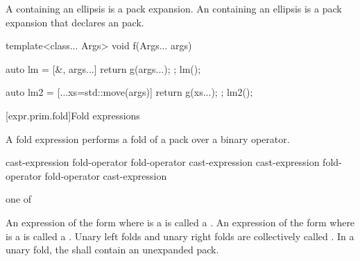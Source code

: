 \pnum
A  containing an ellipsis is a pack
expansion.
%
An  containing an ellipsis is a pack
expansion that declares an
 pack.
\begin{example}
\begin{codeblock}
template<class... Args>
void f(Args... args) {
  auto lm = [&, args...] { return g(args...); };
  lm();

  auto lm2 = [...xs=std::move(args)] { return g(xs...); };
  lm2();
}
\end{codeblock}
\end{example}

[expr.prim.fold]{Fold expressions}%

\pnum
A fold expression performs a fold of a
pack over a binary operator.

\begin{bnf}
\br
    \terminal{(} cast-expression fold-operator  \terminal{)}\br
    \terminal{(}  fold-operator cast-expression \terminal{)}\br
    \terminal{(} cast-expression fold-operator  fold-operator cast-expression \terminal{)}
\end{bnf}

\begin{bnf}
 \textnormal{one of}\br
    \terminal{+ }\quad\terminal{- }\quad\terminal{* }\quad\terminal{/ }\quad\terminal{\% }\quad\terminal{\caret{} }\quad\terminal{\& }\quad\terminal{| }\quad\terminal{<< }\quad\terminal{>> }\br
    \terminal{+=}\quad\terminal{-=}\quad\terminal{*=}\quad\terminal{/=}\quad\terminal{\%=}\quad\terminal{\caret=}\quad\terminal{\&=}\quad\terminal{|=}\quad\terminal{<<=}\quad\terminal{>>=}\quad\terminal{=}\br
    \terminal{==}\quad\terminal{!=}\quad\terminal{< }\quad\terminal{> }\quad\terminal{<=}\quad\terminal{>=}\quad\terminal{\&\&}\quad\terminal{||}\quad\terminal{,  }\quad{}\quad\terminal{->*}
\end{bnf}

\pnum
{}%
An expression of the form
  
where  is a 
is called a .
An expression of the form
  
where  is a 
is called a .
Unary left folds and unary right folds
are collectively called .
In a unary fold,
the 
shall contain an unexpanded pack.

